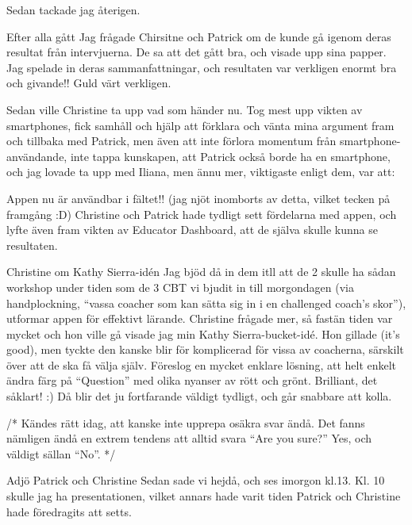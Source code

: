 Sedan tackade jag återigen.

Efter alla gått
Jag frågade Chirsitne och Patrick om de kunde gå igenom deras resultat från intervjuerna. De sa att det gått bra, och visade upp sina papper. Jag spelade in deras sammanfattningar, och resultaten var verkligen enormt bra och givande!! Guld värt verkligen.

Sedan ville Christine ta upp vad som händer nu. Tog mest upp vikten av smartphones, fick samhåll och hjälp att förklara och vänta mina argument fram och tillbaka med Patrick, men även att inte förlora momentum från smartphone-användande, inte tappa kunskapen, att Patrick också borde ha en smartphone, och jag lovade ta upp med Iliana, men ännu mer, viktigaste enligt dem, var att:

Appen nu är användbar i fältet!! (jag njöt inomborts av detta, vilket tecken på framgång :D)
Christine och Patrick hade tydligt sett fördelarna med appen, och lyfte även fram vikten av Educator Dashboard, att de själva skulle kunna se resultaten.

Christine om Kathy Sierra-idén
Jag bjöd då in dem itll att de 2 skulle ha sådan workshop under tiden som de 3 CBT vi bjudit in till morgondagen (via handplockning, “vassa coacher som kan sätta sig in i en challenged coach’s skor”), utformar appen för effektivt lärande. Christine frågade mer, så fastän tiden var mycket och hon ville gå visade jag min Kathy Sierra-bucket-idé.
  Hon gillade (it’s good), men tyckte den kanske blir för komplicerad för vissa av coacherna, särskilt över att de ska få välja själv. Föreslog en mycket enklare lösning, att helt enkelt ändra färg på “Question” med olika nyanser av rött och grönt. Brilliant, det såklart! :) Då blir det ju fortfarande väldigt tydligt, och går snabbare att kolla.

/* Kändes rätt idag, att kanske inte upprepa osäkra svar ändå. Det fanns nämligen ändå en extrem tendens att alltid svara “Are you sure?” Yes, och väldigt sällan “No”. */

Adjö Patrick och Christine
  Sedan sade vi hejdå, och ses imorgon kl.13. Kl. 10 skulle jag ha presentationen, vilket annars hade varit tiden Patrick och Christine hade föredragits att setts.

